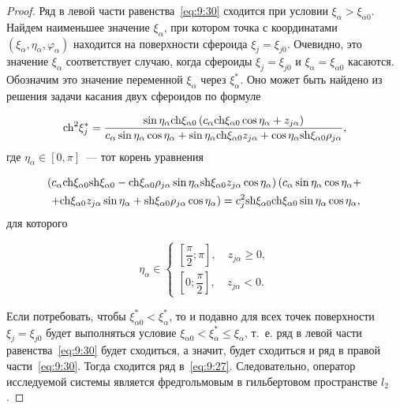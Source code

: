 \begin{proof}
Ряд в левой части равенства~\eqref{eq:9:30} сходится при условии $\xi_{\alpha}>\xi_{\alpha 0}$. Найдем наименьшее значение $\xi_{\alpha}$, при котором точка с координатами $\left( {{\xi _{\alpha}},{\eta _{\alpha}},{\varphi _{\alpha}}} \right)$ находится на поверхности сфероида $\xi_j=\xi_{j0}$. Очевидно, это значение $\xi_{\alpha}$ соответствует случаю, когда сфероиды $\xi_j=\xi_{j0}$ и $\xi_{\alpha}=\xi_{\alpha 0}$ касаются. Обозначим это значение переменной $\xi_{\alpha}$ через $\xi_{\alpha}^*$. Оно может быть найдено из решения задачи касания двух сфероидов по формуле

\begin{equation}
{{\mathop{\rm ch}\nolimits} ^2}\xi _j^* = \frac{{\sin {\eta _\alpha}{\mathop{\rm ch}\nolimits} {\xi _{\alpha 0}}\left( {{c_\alpha}{\mathop{\rm ch}\nolimits} {\xi _{\alpha 0}}\cos {\eta _\alpha} + {z_{j\alpha}}} \right)}}{{{c_\alpha}\sin {\eta _\alpha}\cos {\eta _\alpha} + \sin {\eta _\alpha}{\mathop{\rm ch}\nolimits} {\xi _{\alpha 0}}{z_{j\alpha}} + \cos {\eta _\alpha}{\mathop{\rm sh}\nolimits} {\xi _{\alpha 0}}{\rho _{j\alpha}}}},
\end{equation}
где $\eta_\alpha\in[0,\pi]$~--- тот корень уравнения

\begin{multline}
\left( {{c_\alpha}{\mathop{\rm ch}\nolimits} {\xi _{\alpha 0}}{\mathop{\rm sh}\nolimits} {\xi _{\alpha 0}} - {\mathop{\rm ch}\nolimits} {\xi _{\alpha 0}}{\rho _{j\alpha}}\sin {\eta _\alpha}{\mathop{\rm sh}\nolimits} {\xi _{\alpha 0}}{z_{j\alpha}}\cos {\eta _\alpha}} \right)\left( {{c_\alpha}\sin {\eta _\alpha}\cos {\eta _\alpha} + } \right.\\
\left. { + {\mathop{\rm ch}\nolimits} {\xi _{\alpha 0}}{z_{j\alpha}}\sin {\eta _\alpha} + {\mathop{\rm sh}\nolimits} {\xi _{\alpha 0}}{\rho _{j\alpha}}\cos {\eta _\alpha}} \right) = c_j^2{\mathop{\rm sh}\nolimits} {\xi _{\alpha 0}}{\mathop{\rm ch}\nolimits} {\xi _{\alpha 0}}\sin {\eta _\alpha}\cos {\eta _\alpha},
\end{multline}
для которого

\begin{equation}
{\eta _\alpha} \in \left\{ \begin{array}{l}
\left[ {\dfrac{\pi }{2};\pi } \right],\quad {z_{j\alpha}} \ge 0,\\
\left[ {0;\dfrac{\pi }{2}} \right],\quad {z_{j\alpha}} < 0.
\end{array} \right.
\end{equation}

Если потребовать, чтобы $\xi_{\alpha 0}^*<\xi_{\alpha}^*$, то и подавно для всех точек поверхности $\xi_j=\xi_{j0}$ будет выполняться условие $\xi_{\alpha 0}<\xi_{\alpha}^*\le\xi_{\alpha}$, т.~е. ряд в левой части равенства~\eqref{eq:9:30} будет сходиться, а значит, будет сходиться и ряд в правой части~\eqref{eq:9:30}. Тогда сходится ряд в~\eqref{eq:9:27}. Следовательно, оператор исследуемой системы является фредгольмовым в гильбертовом пространстве $l_2$.
\end{proof}

